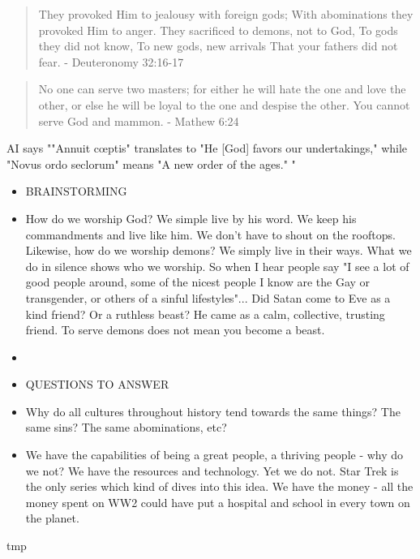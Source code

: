 \documentclass[10pt]{article}
\begin{document}
\begin{multicols}{2}
\begin{quotation}
They provoked Him to jealousy with foreign gods;
With abominations they provoked Him to anger.
They sacrificed to demons, not to God,
To gods they did not know,
To new gods, new arrivals
That your fathers did not fear. - Deuteronomy 32:16-17
\end{quotation}

\begin{quotation}
No one can serve two masters; for either he will hate the one and love the other, or else he will be loyal to the one and despise the other. You cannot serve God and mammon. - Mathew 6:24
\end{quotation}

AI says ""Annuit cœptis" translates to "He [God] favors our undertakings," while "Novus ordo seclorum" means "A new order of the ages." "

\begin{itemize}
\item BRAINSTORMING
\item How do we worship God? We simple live by his word. We keep his commandments and live like him. We don't have to shout on the rooftops. Likewise, how do we worship demons? We simply live in their ways. What we do in silence shows who we worship. So when I hear people say "I see a lot of good people around, some of the nicest people I know are the Gay or transgender, or others of a sinful lifestyles"... Did Satan come to Eve as a kind friend? Or a ruthless beast? He came as a calm, collective, trusting friend. To serve demons does not mean you become a beast.
\item
\end{itemize}

\begin{itemize}
\item QUESTIONS TO ANSWER
\item Why do all cultures throughout history tend towards the same things? The same sins? The same abominations, etc?
\item We have the capabilities of being a great people, a thriving people - why do we not? We have the resources and technology. Yet we do not. Star Trek is the only series which kind of dives into this idea. We have the money - all the money spent on WW2 could have put a hospital and school in every town on the planet.
\end{itemize}





\begin{thebibliography}{9}
	{\footnotesize
		
	 tmp
	
	}
\end{thebibliography}

\end{multicols}


\end{document}
